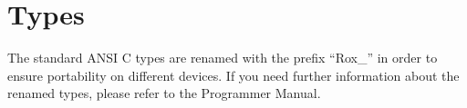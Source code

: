 \section{Types}
\label{sec:types}
The standard ANSI C types are renamed with the prefix ``Rox\_'' in order to ensure portability on different devices. 
If you need further information about the renamed types, please refer to the Programmer Manual.
